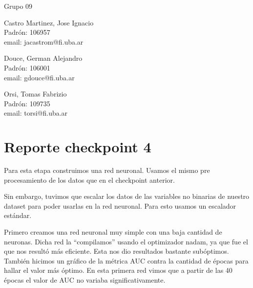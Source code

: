 \documentclass{article}
\begin{document}
\begin{titlepage}
  \vspace{0.4cm}
  \begin{center}
    {\Large{Grupo 09}}\\
    \vspace{0.6cm}
    {\begin{minipage}[t]{.32\textwidth}
        \begin{center}
	Castro  Martinez, Jose Ignacio\\
          {\small{Padrón: 106957}}\\
          {\small{email: jacastrom@fi.uba.ar}}
        \end{center}
	\end{minipage}
	\begin{minipage}[t]{.32\textwidth}
        \begin{center}
	Douce, German Alejandro\\
          {\small{Padrón: 106001}}\\
          {\small{email: gdouce@fi.uba.ar}}\\
        \end{center}
      \end{minipage}
      \begin{minipage}[t]{.32\textwidth}
        \begin{center}
          Orsi, Tomas Fabrizio\\
          {\small{Padrón: 109735}}\\
          {\small{email: torsi@fi.uba.ar}}
        \end{center}
      \end{minipage}}
  \end{center}
\end{titlepage}

\section*{Reporte checkpoint 4}
Para esta etapa construimos una red neuronal. Usamos el mismo pre procesamiento de los datos que en el checkpoint anterior. 

Sin embargo, tuvimos que escalar los datos de las variables no binarias de nuestro dataset para poder usarlas en la red neuronal. Para esto usamos un escalador estándar.

Primero creamos una red neuronal muy simple con una baja cantidad de neuronas. Dicha red la “compilamos” usando el optimizador nadam, ya que fue el que nos resultó más eficiente. Esta nos dio resultados bastante subóptimos. También hicimos un gráfico de la métrica AUC contra la cantidad de épocas para hallar el valor más óptimo. En esta primera red vimos que a partir de las 40 épocas el valor de AUC no variaba significativamente.
\end{document}
